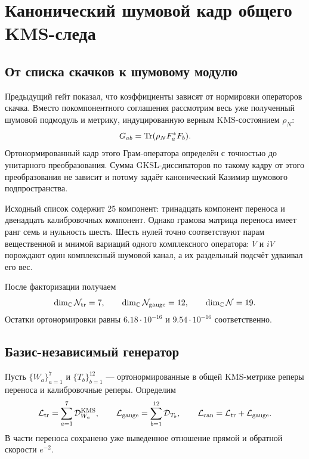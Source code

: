 \chapter{Канонический шумовой кадр общего KMS-следа}
\label{ch:v8-canonical-noise-frame-common-trace-gate}

\section{От списка скачков к шумовому модулю}

Предыдущий гейт показал, что коэффициенты зависят от нормировки операторов
скачка. Вместо покомпонентного соглашения рассмотрим весь уже полученный
шумовой подмодуль и метрику, индуцированную верным KMS-состоянием
$\rho_N$:
\begin{equation}
 G_{ab}=\operatorname{Tr}(\rho_N F_a^*F_b).
 \label{eq:v8-common-trace-noise-gram}
\end{equation}
Ортонормированный кадр этого Грам-оператора определён с точностью до
унитарного преобразования. Сумма GKSL-диссипаторов по такому кадру от этого
преобразования не зависит и потому задаёт канонический Казимир шумового
подпространства.

Исходный список содержит 25 компонент: тринадцать компонент переноса и двенадцать
калибровочных компонент. Однако грамова матрица переноса имеет ранг семь и нульность шесть.
Шесть нулей точно соответствуют парам вещественной и мнимой вариаций одного
комплексного оператора: $V$ и $iV$ порождают один комплексный шумовой канал,
а их раздельный подсчёт удваивал его вес.

После факторизации получаем
\begin{equation}
 \dim_{\mathbb C}\mathcal N_{\rm tr}=7,
 \qquad
 \dim_{\mathbb C}\mathcal N_{\rm gauge}=12,
 \qquad
 \dim_{\mathbb C}\mathcal N=19.
 \label{eq:v8-common-trace-noise-dimension}
\end{equation}
Остатки ортонормировки равны $6.18\cdot10^{-16}$ и
$9.54\cdot10^{-16}$ соответственно.

\section{Базис-независимый генератор}

Пусть $\{W_a\}_{a=1}^{7}$ и $\{T_b\}_{b=1}^{12}$ --- ортонормированные в
общей KMS-метрике реперы переноса и калибровочные реперы. Определим
\begin{equation}
 \mathcal L_{\rm tr}=
 \sum_{a=1}^{7}\mathcal D^{\rm KMS}_{W_a},
 \qquad
 \mathcal L_{\rm gauge}=\sum_{b=1}^{12}\mathcal D_{T_b},
 \qquad
 \mathcal L_{\rm can}=\mathcal L_{\rm tr}+\mathcal L_{\rm gauge}.
 \label{eq:v8-canonical-noise-casimir}
\end{equation}
В части переноса сохранено уже выведенное отношение прямой и обратной
скорости $e^{-2}$.

